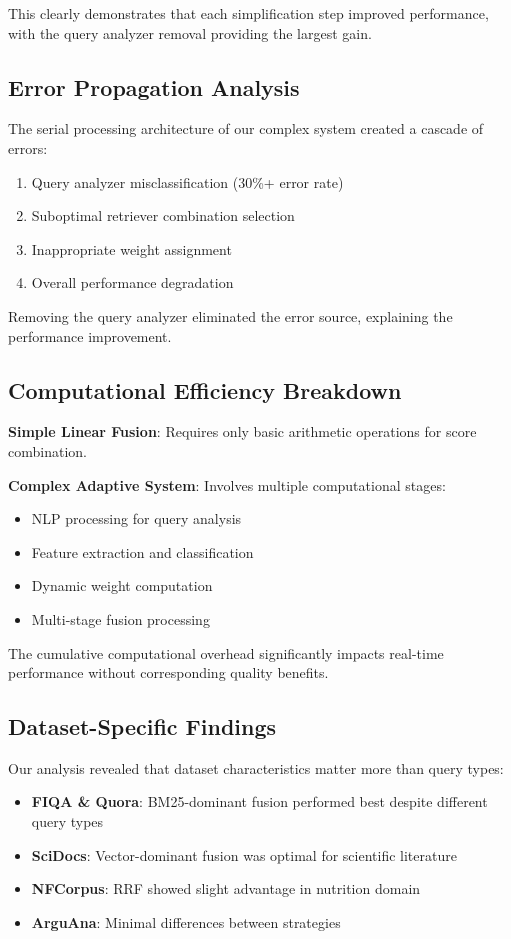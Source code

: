 \documentclass[letterpaper]{article} %
\begin{document}
This clearly demonstrates that each simplification step improved performance, with the query analyzer removal providing the largest gain.

\subsection{Error Propagation Analysis}

The serial processing architecture of our complex system created a cascade of errors:
\begin{enumerate}
\item Query analyzer misclassification (30\%+ error rate)
\item Suboptimal retriever combination selection
\item Inappropriate weight assignment
\item Overall performance degradation
\end{enumerate}

Removing the query analyzer eliminated the error source, explaining the performance improvement.

\subsection{Computational Efficiency Breakdown}

\textbf{Simple Linear Fusion}: Requires only basic arithmetic operations for score combination.

\textbf{Complex Adaptive System}: Involves multiple computational stages:
\begin{itemize}
\item NLP processing for query analysis
\item Feature extraction and classification
\item Dynamic weight computation
\item Multi-stage fusion processing
\end{itemize}

The cumulative computational overhead significantly impacts real-time performance without corresponding quality benefits.

\subsection{Dataset-Specific Findings}

Our analysis revealed that dataset characteristics matter more than query types:
\begin{itemize}
\item \textbf{FIQA \& Quora}: BM25-dominant fusion performed best despite different query types
\item \textbf{SciDocs}: Vector-dominant fusion was optimal for scientific literature
\item \textbf{NFCorpus}: RRF showed slight advantage in nutrition domain
\item \textbf{ArguAna}: Minimal differences between strategies
\end{itemize}
\end{document}
